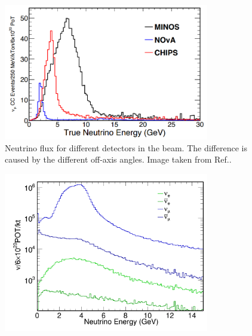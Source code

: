\begin{figure} %
    \includegraphics[width=0.8\textwidth]{diagrams/4-chips/numi_axis.png}
    \caption[Neutrino flux for different detectors in the \numi beam.]
    {Neutrino flux for different detectors in the \numi beam.
        The difference is caused by the different off-axis angles.
        Image taken from Ref.\cite{adamson2013}.}
    \label{fig:numi_axis}
\end{figure} %

\begin{figure} %
    \includegraphics[width=0.8\textwidth]{diagrams/4-chips/flux.png}
    \caption[flux short]
    {}
    \label{fig:flux}
\end{figure} %

